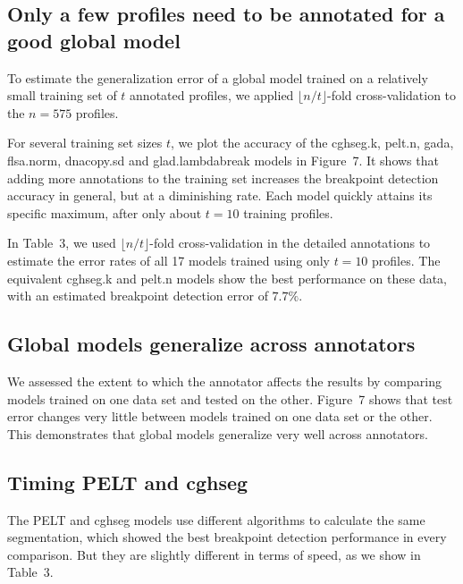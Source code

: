 \documentclass[10pt]{bmc_article}
\newenvironment{bmcformat}{\begin{raggedright}\baselineskip20pt\sloppy\setboolean{publ}{false}}{\end{raggedright}\baselineskip20pt\sloppy}
\begin{document}
\begin{bmcformat}

\subsection*{Only a few profiles need to be annotated for a good global
  model}

To estimate the generalization error of a global model trained on a
relatively small training set of $t$ annotated profiles, we applied
$\lfloor n/t\rfloor $-fold cross-validation to the $n=575$ profiles.

For several training set sizes $t$, we plot the accuracy of the
cghseg.k, pelt.n, gada, flsa.norm, dnacopy.sd and glad.lambdabreak
models in Figure~7. It shows that adding more annotations to the
training set increases the breakpoint detection accuracy in general,
but at a diminishing rate. Each model quickly attains its specific
maximum, after only about $t=10$ training profiles.

In Table~3, we used $\lfloor n/t\rfloor $-fold cross-validation in the
detailed annotations to estimate the error rates of all 17 models
trained using only $t=10$ profiles.
The equivalent cghseg.k and pelt.n models show the best performance on
these data, with an estimated breakpoint detection error of $ 7.7\%$.

\subsection*{Global models generalize across annotators}

We assessed the extent to which the annotator affects the results by
comparing models trained on one data set and tested on the
other. Figure~7 shows that test error changes very little between
models trained on one data set or the other. This demonstrates that
global models generalize very well across annotators.

\subsection*{Timing PELT and cghseg}
The PELT and cghseg models use different algorithms to calculate the
same segmentation, which showed the best breakpoint detection
performance in every comparison. But they are slightly different in
terms of speed, as we show in Table~3.


\end{bmcformat}
\end{document}
